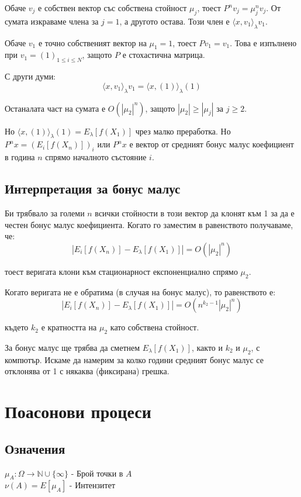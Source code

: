 \documentclass{article}
\begin{document}
Обаче $v_j$ е собствен вектор със собствена стойност $\mu_j$, тоест $P^n v_j = \mu_j^n v_j$. От сумата изкраваме члена за $j=1$, а другото остава. Този член е $\langle x,v_1 \rangle_\lambda v_1$.

Обаче $v_1$ е точно собственият вектор на $\mu_1=1$, тоест $P v_1 = v_1$. Това е изпълнено при $v_1 = (1)_{1\leq i\leq N}$, защото $P$ е стохастична матрица.

С други думи:
$$\langle x,v_1 \rangle_\lambda v_1 = \langle x,(1) \rangle_\lambda (1)$$

Останалата част на сумата е $O(|\mu_2|^n)$, защото $|\mu_2| \geq |\mu_j|$ за $j\geq2$.

Но $\langle x,(1) \rangle_\lambda (1) = E_\lambda[f(X_1)]$ чрез малко преработка. Но $P^n x = (E_i[f(X_n)])_i$ или $P^n x$ е вектор от средният бонус малус коефициент в година $n$ спрямо началното състояние $i$.

\subsection{Интерпретация за бонус малус}
Би трябвало за големи $n$ всички стойности в този вектор да клонят към 1 за да е честен бонус малус коефициента. Когато го заместим в равенството получаваме, че:
$$|E_i[f(X_n)] - E_\lambda[f(X_1)]| = O(|\mu_2|^n)$$

тоест веригата клони към стационарност експоненциално спрямо $\mu_2$.

Когато веригата не е обратима (в случая на бонус малус), то равенството е:
$$|E_i[f(X_n)] - E_\lambda[f(X_1)]| = O(n^{k_2-1}|\mu_2|^n)$$

където $k_2$ е кратността на $\mu_2$ като собствена стойност.

За бонус малус ще трябва да сметнем $E_\lambda[f(X_1)]$, както и $k_2$ и $\mu_2$, с компютър. Искаме да намерим за колко години средният бонус малус се отклонява от 1 с някаква (фиксирана) грешка.

\section{Поасонови процеси}

\subsection{Означения}
$\mu_A: \Omega \to \mathbb{N} \cup \{\infty\}$ - Брой точки в $A$ \\
$\nu(A) = E[\mu_A]$ - Интензитет
\end{document}
